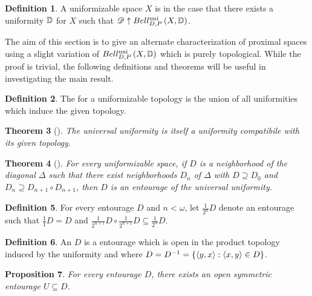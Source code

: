 \documentclass{amsart}
\newtheorem{theorem}{Theorem}[section]
\newtheorem{proposition}[theorem]{Proposition}
\theoremstyle{definition}
\newtheorem{definition}[theorem]{Definition}
\begin{document}
  \begin{definition}
    A uniformizable space \(X\) is 
    in the case that there exists a uniformity
    \(\mathbb{D}\) for \(X\) such that \(\mathscr{D}\uparrow Bell_{D,P}^{\textrm{uni}}\left({X,\mathbb{D}}\right)\).
  \end{definition}

  The aim of this section is to give an alternate characterization of
  proximal spaces using a slight variation of \(Bell_{D,P}^{\textrm{uni}}\left({X,\mathbb{D}}\right)\)
  which is purely topological. While the proof is trivial, the
  following definitions and theorems will be useful in investigating the main
  result.

  \begin{definition}
    The  for a uniformizable topology is the
    union of all uniformities which induce the given topology.
  \end{definition}

  \begin{theorem}[\cite{MR2048350}]
    The universal uniformity is itself a uniformity compatibile with
    its given topology.
  \end{theorem}

  \begin{theorem}[\cite{MR2048350}]\label{halvingEntrouages}
    For every uniformizable space, if \(D\) is a neighborhood of the diagonal
    \(\Delta\)  such that there exist neighborhoods \(D_n\) of \(\Delta\) with
    \(D\supseteq D_0\) and
    \(D_n \supseteq D_{n+1}\circ D_{n+1}\), then \(D\) is an
    entourage of the universal uniformity.
  \end{theorem}

  \begin{definition}
    For every entourage \(D\) and \(n<\omega\), let \(\frac{1}{2^n}D\)
    denote an entourage such that \(\frac{1}{1}D=D\) and
    \(\frac{1}{2^{n+1}}D\circ\frac{1}{2^{n+1}}D\subseteq\frac{1}{2^n}D\).
  \end{definition}

  \begin{definition}
    An  \(D\) is a entourage
    which is open in the product topology induced by the uniformity and where
    \(D=D^{-1}=\{\langle y,x\rangle:\langle x,y\rangle\in D\}\).
  \end{definition}

  \begin{proposition}
    For every entourage \(D\), there exists an open symmetric
    entourage \(U\subseteq D\).
  \end{proposition}
\end{document}
